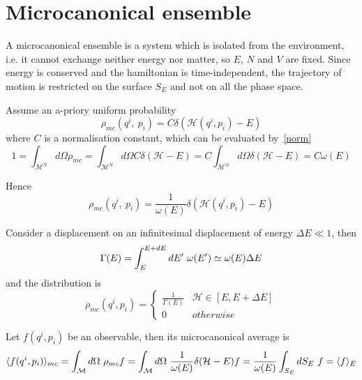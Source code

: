 \chapter{Microcanonical ensemble}

    A microcanonical ensemble is a system which is isolated from the environment, i.e. it cannot exchange neither energy nor matter, so $E$, $N$ and $V$ are fixed. Since energy is conserved and the hamiltonian is time-independent, the trajectory of motion is restricted on the surface $S_E$ and not on all the phase space.
    
    Assume an a-priory uniform probability 
    \begin{equation*}
        \rho_{mc}(q^i, ~p_i) = C \delta (\mathcal H(q^i, p_i) - E)
    \end{equation*}
    where $C$ is a normalisation constant, which can be evaluated by~\eqref{norm}
    \begin{equation*}
        1 = \int_{\mathcal M^N} d\Omega \rho_{mc} = \int_{\mathcal M^N} d\Omega C \delta(\mathcal H - E) = C \int_{\mathcal M^N} d\Omega \delta(\mathcal H - E) = C \omega(E)
    \end{equation*}

    Hence
    \begin{equation*}
        \rho_{mc}(q^i, ~p_i) = \frac{1}{\omega(E)} \delta (\mathcal H(q^i, p_i) - E)
    \end{equation*}

    Consider a displacement on an infinitesimal displacement of energy $\Delta E \ll 1$, then 
    \begin{equation*}
        \Gamma (E) = \int_{E}^{E+dE}dE'~ \omega(E') \simeq \omega(E) \Delta E
    \end{equation*}
    and the distribution is 
    \begin{equation*}
        \rho_{mc}(q^i, p_i) = \begin{cases}
            \frac{1}{\Gamma(E)} & \mathcal H \in [E, E + \Delta E] \\
            0 & otherwise
        \end{cases}
    \end{equation*}

    Let $f(q^i, p_i)$ be an observable, then its microcanonical average is 
    \begin{equation}\label{obs}
        \langle f(q^i, p_i)\rangle_{mc} = \int_{\mathcal M} d\Omega ~ \rho_{mc} f = \int_{\mathcal M} d\Omega ~ \frac{1}{\omega(E)} \delta (\mathcal H - E) f = \frac{1}{\omega(E)} \int_{S_E} dS_E ~ f = \langle f\rangle_{E} 
    \end{equation}

